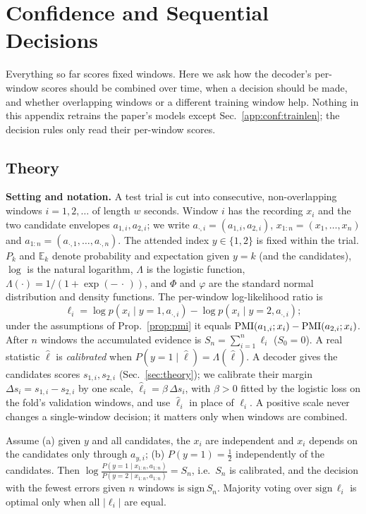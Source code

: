 \section{Confidence and Sequential Decisions}\label{app:conf}
Everything so far scores fixed windows. Here we ask how the decoder's per-window scores should
be combined over time, when a decision should be made, and whether overlapping windows or a
different training window help. Nothing in this appendix retrains the paper's models except
Sec.~\ref{app:conf:trainlen}; the decision rules only read their per-window scores.

\subsection{Theory}\label{app:conf:theory}
\textbf{Setting and notation.} A test trial is cut into consecutive, non-overlapping
windows $i=1,2,\dots$ of length $w$ seconds. Window $i$ has the recording $x_i$ and the two
candidate envelopes $a_{1,i},a_{2,i}$; we write $a_{\cdot,i}=(a_{1,i},a_{2,i})$,
$x_{1:n}=(x_1,\dots,x_n)$ and $a_{1:n}=(a_{\cdot,1},\dots,a_{\cdot,n})$. The attended index
$y\in\{1,2\}$ is fixed within the trial. $P_k$ and $\mathbb E_k$ denote probability and
expectation given $y=k$ (and the candidates), $\log$ is the natural logarithm,
$\Lambda$ is the logistic function, $\Lambda(\cdot)=1/(1+\exp(-\,\cdot\,))$, and $\Phi$ and $\varphi$ are the standard
normal distribution and density functions. The per-window log-likelihood ratio is
\[\ell_i=\log p(x_i\mid y{=}1,a_{\cdot,i})-\log p(x_i\mid y{=}2,a_{\cdot,i});\]
under the assumptions of Prop.~\ref{prop:pmi} it equals $\mathrm{PMI}(a_{1,i};x_i)-\mathrm{PMI}(a_{2,i};x_i)$.
After $n$ windows the accumulated evidence is $S_n=\sum_{i=1}^n\ell_i$ ($S_0=0$). A real
statistic $\hat\ell$ is \emph{calibrated} when $P(y{=}1\mid\hat\ell)=\Lambda(\hat\ell)$. A decoder gives the
candidates scores $s_{1,i},s_{2,i}$ (Sec.~\ref{sec:theory}); we calibrate their margin
$\Delta s_i=s_{1,i}-s_{2,i}$ by one scale, $\hat\ell_i=\beta\,\Delta s_i$, with $\beta>0$ fitted by the
logistic loss on the fold's validation windows, and use $\hat\ell_i$ in place of $\ell_i$. A
positive scale never changes a single-window decision; it matters only when windows are
combined.

\begin{proposition}\label{prop:add}
Assume (a) given $y$ and all candidates, the $x_i$ are independent and $x_i$ depends on the
candidates only through $a_{y,i}$; (b) $P(y{=}1)=\tfrac12$ independently of the candidates.
Then $\log\frac{P(y=1\mid x_{1:n},a_{1:n})}{P(y=2\mid x_{1:n},a_{1:n})}=S_n$, i.e.\ $S_n$ is
calibrated, and the decision with the fewest errors given $n$ windows is $\mathrm{sign}\,S_n$. Majority
voting over $\mathrm{sign}\,\ell_i$ is optimal only when all $|\ell_i|$ are equal.
\end{proposition}

